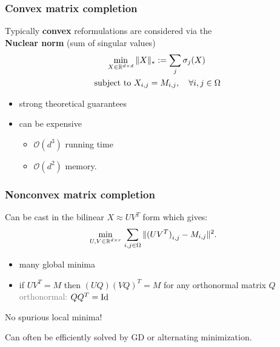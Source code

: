 \documentclass[aspectratio=149]{beamer}
\begin{document}
\begin{frame}
  \frametitle{Convex matrix completion}

  Typically \textbf{convex} reformulations are considered via the\\
  \textbf{Nuclear norm} (sum of singular values)
  \begin{align}
    \min_{X\in \mathbb{R}^{d\times d}} &\, \Vert X \Vert_* := \sum_j \sigma_j(X) \\
    \text{subject to } & X_{i,j} = M_{i,j}, \quad \forall i,j \in \Omega
  \end{align}
  \begin{itemize}
    \item strong theoretical guarantees
    \item can be expensive
          \begin{itemize}
            \item $\mathcal{O}(d^3)$ running time
            \item $\mathcal{O}(d^2)$ memory.
          \end{itemize}
  \end{itemize}
\end{frame}


\begin{frame}
  \frametitle{Nonconvex matrix completion}
  Can be cast in the bilinear $X \approx U V^T$ form which gives:
  \begin{align}
    \min_{U, V \in \mathbb{R}^{d\times r}} &\, \sum_{i,j \in \Omega} \Vert {(UV^T)}_{i,j} - M_{i,j} \Vert^2.
  \end{align}
  \begin{itemize}
    \item many global minima
    \item if $UV^T = M$ then $(UQ){(VQ)}^T = M$ for any orthonormal matrix $Q$ \\
          \textcolor{gray}{orthonormal: $Q Q^T = \operatorname*{Id}$}
  \end{itemize}

  \begin{block}{}
    \center
    No spurious local minima!
  \end{block}
  Can often be efficiently solved by GD or alternating minimization.

\end{frame}
\end{document}
